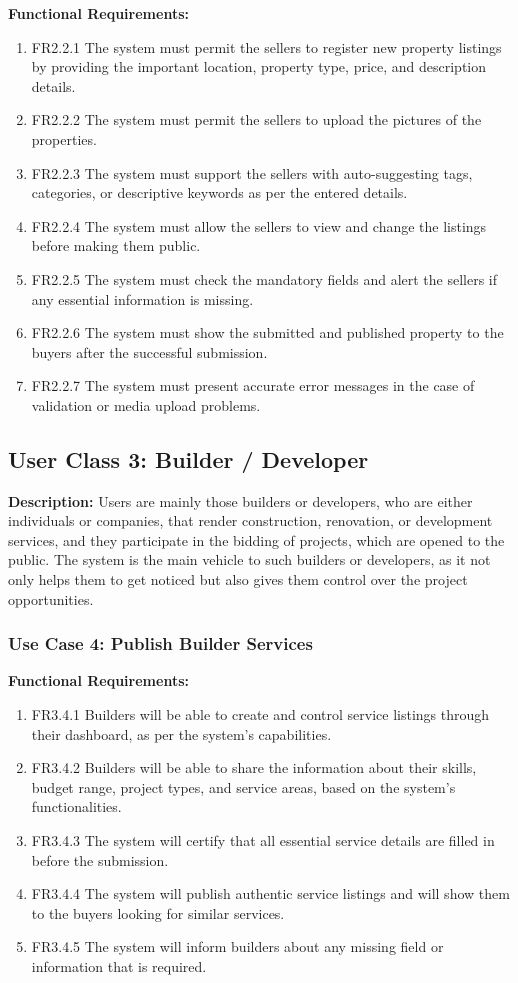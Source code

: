 \textbf{Functional Requirements:}
\begin{enumerate}
    \item FR2.2.1 The system must permit the sellers to register new property listings by providing the important location, property type, price, and description details.
    \item FR2.2.2 The system must permit the sellers to upload the pictures of the properties.
    \item FR2.2.3 The system must support the sellers with auto-suggesting tags, categories, or descriptive keywords as per the entered details.
    \item FR2.2.4 The system must allow the sellers to view and change the listings before making them public.
    \item FR2.2.5 The system must check the mandatory fields and alert the sellers if any essential information is missing.
    \item FR2.2.6 The system must show the submitted and published property to the buyers after the successful submission.
    \item FR2.2.7 The system must present accurate error messages in the case of validation or media upload problems.
\end{enumerate}

\subsection{User Class 3: Builder / Developer}

\textbf{Description:} Users are mainly those builders or developers, who are either individuals or companies, that render construction, renovation, or development services, and they participate in the bidding of projects, which are opened to the public. The system is the main vehicle to such builders or developers, as it not only helps them to get noticed but also gives them control over the project opportunities.

\subsubsection{Use Case 4: Publish Builder Services}

\textbf{Functional Requirements:}
\begin{enumerate}
    \item FR3.4.1 Builders will be able to create and control service listings through their dashboard, as per the system's capabilities.
    \item FR3.4.2 Builders will be able to share the information about their skills, budget range, project types, and service areas, based on the system's functionalities.
    \item FR3.4.3 The system will certify that all essential service details are filled in before the submission.
    \item FR3.4.4 The system will publish authentic service listings and will show them to the buyers looking for similar services.
    \item FR3.4.5 The system will inform builders about any missing field or information that is required.
\end{enumerate}

